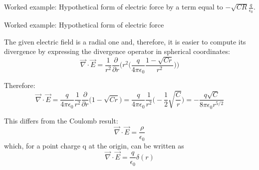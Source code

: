 {\begin{frame}{Worked example: Hypothetical form of electric force}
  by a term equal to
  $\displaystyle -\sqrt{CR} \frac{q}{\epsilon_0}$.

\end{frame}

%
%
%

\begin{frame}{Worked example: Hypothetical form of electric force}

  The given electric field is a radial one and,
  therefore, it is easier to compute its divergence by expressing
  the divergence operator in spherical coordinates:
  \begin{equation*}
    \vec{\nabla} \cdot \vec{E} =
     \frac{1}{r^2} \frac{\partial}{\partial r}
      \Bigg( r^2
        \Big(
          \frac{q}{4\pi \epsilon_0}
          \frac{1-\sqrt{Cr}}{r^2}
        \Big)
      \Bigg)
  \end{equation*}

  Therefore:
  \begin{equation*}
    \vec{\nabla} \cdot \vec{E} =
      \frac{q}{4\pi \epsilon_0}
      \frac{1}{r^2}
      \frac{\partial}{\partial r}
      \Big( 1-\sqrt{Cr} \Big) =
      \frac{q}{4\pi \epsilon_0}
      \frac{1}{r^2}
      \Big(-\frac{1}{2}\sqrt{\frac{C}{r}} \Big) =
      - \frac{q \sqrt{C}}{8\pi \epsilon_0 r^{5/2}}
  \end{equation*}

  This differs from the Coulomb result:
  \begin{equation*}
    \vec{\nabla} \cdot \vec{E} = \frac{\rho}{\epsilon_0}
  \end{equation*}
  which, for a point charge q at the origin, can be written as
  \begin{equation*}
    \vec{\nabla} \cdot \vec{E} = \frac{q}{\epsilon_0} \delta(r)
  \end{equation*}

\end{frame}

} %


%
%

